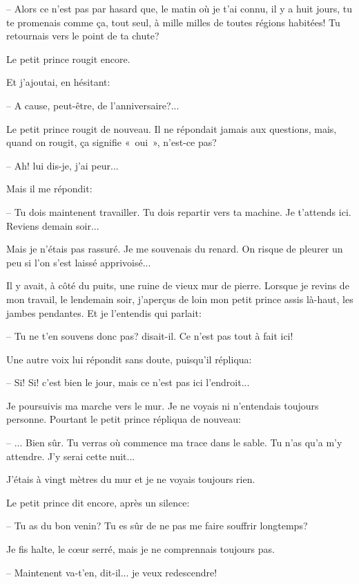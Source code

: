 \documentclass[a4paper]{report}
\begin{document}
-- Alors ce n'est pas par hasard que, le matin où je t'ai connu, il y a huit jours, tu te promenais comme ça, tout seul, à mille milles de toutes régions habitées! Tu retournais vers le point de ta chute?

Le petit prince rougit encore.

Et j'ajoutai, en hésitant:

-- A cause, peut-être, de l'anniversaire?...

Le petit prince rougit de nouveau. Il ne répondait jamais aux questions, mais, quand on rougit, ça signifie «~oui~», n'est-ce pas?

-- Ah! lui dis-je, j'ai peur...

Mais il me répondit:

-- Tu dois maintenent travailler. Tu dois repartir vers ta machine. Je t'attends ici. Reviens demain soir...

Mais je n'étais pas rassuré. Je me souvenais du renard. On risque de pleurer un peu si l'on s'est laissé apprivoisé...

\parachapter{} %
Il y avait, à côté du puits, une ruine de vieux mur de pierre. Lorsque je revins de mon travail, le lendemain soir, j'aperçus de loin mon petit prince assis là-haut, les jambes pendantes. Et je l'entendis qui parlait:

-- Tu ne t'en souvens donc pas? disait-il. Ce n'est pas tout à fait ici!

Une autre voix lui répondit sans doute, puisqu'il répliqua:

-- Si! Si! c'est bien le jour, mais ce n'est pas ici l'endroit...

Je poursuivis ma marche vers le mur. Je ne voyais ni n'entendais toujours personne. Pourtant le petit prince répliqua de nouveau:

-- ... Bien sûr. Tu verras où commence ma trace dans le sable. Tu n'as qu'a m'y attendre. J'y serai cette nuit...

J'étais à vingt mètres du mur et je ne voyais toujours rien.

Le petit prince dit encore, après un silence:

-- Tu as du bon venin? Tu es sûr de ne pas me faire souffrir longtemps?

Je fis halte, le cœur serré, mais je ne comprennais toujours pas.

-- Maintenent va-t'en, dit-il... je veux redescendre! 
\end{document}
